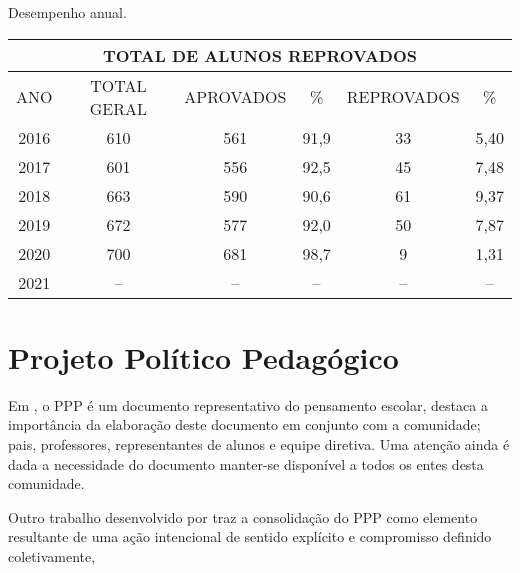 \begin{quadro}[ht!]
    \centering
    \caption{Desempenho anual.}
    \label{qua:totalReprovacao}
    \begin{tabular}{|cccccc|}
        \hline
        \multicolumn{6}{|c|}{\textbf{TOTAL DE ALUNOS REPROVADOS}}                                                                                     \\ \hline
        \multicolumn{1}{|c|}{ANO} & \multicolumn{1}{c|}{TOTAL GERAL} & \multicolumn{1}{c|}{APROVADOS} & \multicolumn{1}{c|}{\%} & \multicolumn{1}{c|}{REPROVADOS} & \% \\ \hline
        \multicolumn{1}{|c|}{2016} & \multicolumn{1}{c|}{610} & \multicolumn{1}{c|}{561} & \multicolumn{1}{c|}{91,9} & \multicolumn{1}{c|}{33} & 5,40 \\ \hline
        \multicolumn{1}{|c|}{2017} & \multicolumn{1}{c|}{601} & \multicolumn{1}{c|}{556} & \multicolumn{1}{c|}{92,5} & \multicolumn{1}{c|}{45} & 7,48 \\ \hline
        \multicolumn{1}{|c|}{2018} & \multicolumn{1}{c|}{663} & \multicolumn{1}{c|}{590} & \multicolumn{1}{c|}{90,6} & \multicolumn{1}{c|}{61} & 9,37 \\ \hline
        \multicolumn{1}{|c|}{2019} & \multicolumn{1}{c|}{672} & \multicolumn{1}{c|}{577} & \multicolumn{1}{c|}{92,0} & \multicolumn{1}{c|}{50} & 7,87 \\ \hline
        \multicolumn{1}{|c|}{2020} & \multicolumn{1}{c|}{700} & \multicolumn{1}{c|}{681} & \multicolumn{1}{c|}{98,7} & \multicolumn{1}{c|}{9}  & 1,31 \\ \hline
        \multicolumn{1}{|c|}{2021} & \multicolumn{1}{c|}{--}  & \multicolumn{1}{c|}{--}  & \multicolumn{1}{c|}{--}   & \multicolumn{1}{c|}{--} & --   \\ \hline
    \end{tabular}
\end{quadro}
\newpage
\section{Projeto Político Pedagógico}
Em \cite{CARVALHO:2012a}, o \ac{PPP} é um documento representativo do pensamento escolar, destaca a importância da elaboração deste documento em conjunto com a comunidade; pais, professores, representantes de alunos e equipe diretiva. Uma atenção ainda é dada a necessidade do documento manter-se disponível a todos os entes desta comunidade. 

Outro trabalho desenvolvido por \cite{VEIGA:1995} traz a consolidação do PPP como elemento resultante de uma ação intencional de sentido explícito e compromisso definido coletivamente,

